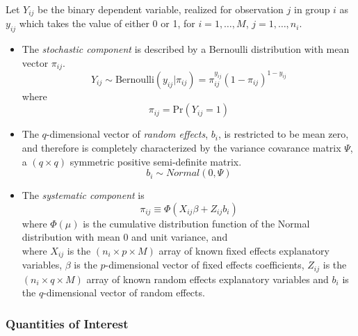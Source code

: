 Let $Y_{ij}$ be the binary dependent variable, realized for observation $j$ in group $i$ as $y_{ij}$ which takes the value of either 0 or 1, for $i = 1, \ldots, M$, $j = 1, \ldots, n_i$.

\begin{itemize}
\item The \emph{stochastic component} is described by a Bernoulli distribution with mean vector $\pi_{ij}$.
\begin{equation*}
Y_{ij} \sim \mathrm{Bernoulli}(y_{ij} | \pi_{ij}) = \pi_{ij}^{y_{ij}} (1 - \pi_{ij})^{1 - y_{ij}}
\end{equation*}
where
\begin{equation*}
\pi_{ij} = \mathrm{Pr}(Y_{ij} = 1)
\end{equation*}
\item The $q$-dimensional vector of \emph{random effects}, $b_i$, is restricted to be mean zero, and therefore is completely characterized by the variance covarance matrix $\Psi$, a $(q \times q)$ symmetric positive semi-definite matrix.
\begin{equation*}
b_i \sim Normal(0, \Psi)
\end{equation*}
\item The \emph{systematic component} is
\begin{equation*}
\pi_{ij} \equiv \Phi(X_{ij} \beta + Z_{ij} b_i)
\end{equation*}
where $\Phi(\mu)$ is the cumulative distribution function of the Normal distribution with mean 0 and unit variance, and \\
where $X_{ij}$ is the $(n_i \times p \times M)$ array of known fixed effects explanatory variables, $\beta$ is the $p$-dimensional vector of fixed effects coefficients, $Z_{ij}$ is the $(n_i \times q \times M)$ array of known random effects explanatory variables and $b_i$ is the $q$-dimensional vector of random effects.
\end{itemize}


\subsubsection{Quantities of Interest}


